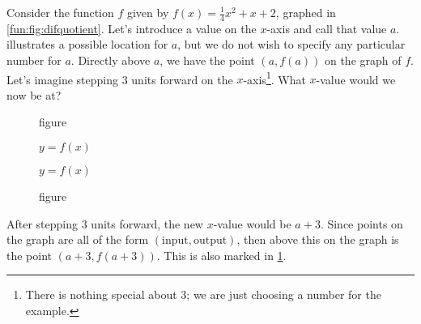\begin{pccexample}
Consider the function $f$ given by $f(x)=\frac{1}{4}x^2+x+2$, graphed in \cref{fun:fig:difquotient}. Let's introduce a value on the $x$-axis and call that value $a$.  illustrates a possible location for $a$, but we do not wish to specify any particular number for $a$. Directly above $a$, we have the point $(a,f(a))$ on the graph of $f$. Let's imagine stepping \num{3} units forward on the $x$-axis\footnote{There is nothing special about \num{3}; we are just choosing a number for the example.}. What $x$-value would we now be at?


\begin{figure}[!htb]
  \begin{minipage}{.45\textwidth}
  			\centering
            \caption{figure}{$y=f(x)$}
			\label{fun:fig:difquotient}
\end{minipage}\hfill
  \begin{minipage}{.45\textwidth}
  			\centering
            \caption{figure}{$y=f(x)$}
			\label{fun:fig:difquotient2}
\end{minipage}
\end{figure}
   

After stepping \num{3} units forward, the new $x$-value would be $a+3$. Since points on the graph are all of the form $(\text{input},\text{output})$, then above this on the graph is the point $(a+3,f(a+3))$. This is also marked in \cref{fun:fig:difquotient2}.


\end{pccexample}
